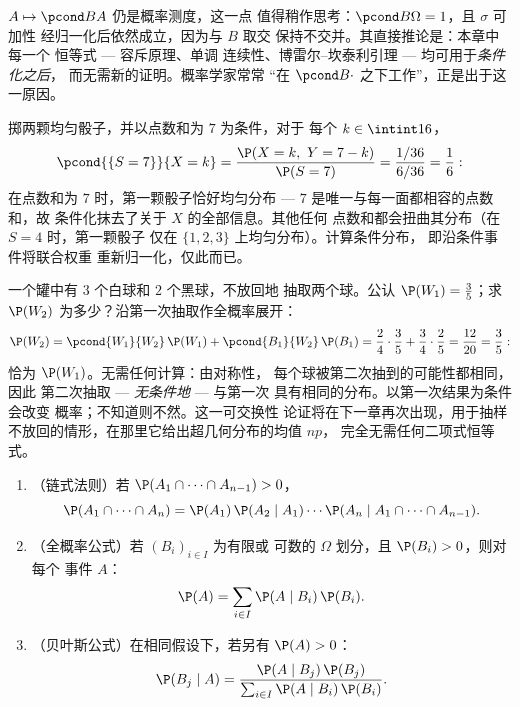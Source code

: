 \begin{remark}
$A \mapsto \pcond BA$ 仍是概率测度，这一点
值得稍作思考：$\pcond B\Omega = 1$，且 $\sigma$ 可加性
经归一化后依然成立，因为与 $B$ 取交
保持不交并。其直接推论是：本章中每一个
恒等式 --- 容斥原理、单调
连续性、博雷尔–坎泰利引理 --- 均可用于\emph{条件化之后}，
而无需新的证明。概率学家常常
“在 $\pcond B{\cdot}$ 之下工作”，正是出于这一原因。
\end{remark}

\begin{example}\label{ex:b2:proba:sumseven}
掷两颗均匀骰子，并以点数和为 $7$ 为条件，对于
每个 $k \in \intint16$，
\[
\pcond{\{S = 7\}}{X = k}
= \frac{\P(X = k,\ Y = 7 - k)}{\P(S = 7)}
= \frac{1/36}{6/36} = \frac16 :
\]
在点数和为 $7$ 时，第一颗骰子恰好均匀分布 ---
$7$ 是唯一与每一面都相容的点数和，故
条件化抹去了关于 $X$ 的全部信息。其他任何
点数和都会扭曲其分布（在 $S = 4$ 时，第一颗骰子
仅在 $\{1, 2, 3\}$ 上均匀分布）。计算条件分布，
即沿条件事件将联合权重
重新归一化，仅此而已。
\end{example}

\begin{example}\label{ex:b2:proba:seconddraw}
一个罐中有 $3$ 个白球和 $2$ 个黑球，不放回地
抽取两个球。公认 $\P(W_1) = \frac35$；求
$\P(W_2)$ 为多少？沿第一次抽取作全概率展开：
\[
\P(W_2) = \pcond{W_1}{W_2}\,\P(W_1) +
\pcond{B_1}{W_2}\,\P(B_1)
= \frac24\cdot\frac35 + \frac34\cdot\frac25
= \frac{12}{20} = \frac35 :
\]
恰为 $\P(W_1)$。无需任何计算：由对称性，
每个球被第二次抽到的可能性都相同，因此
第二次抽取 --- \emph{无条件地} --- 与第一次
具有相同的分布。以第一次结果为条件会改变
概率；不知道则不然。这一可交换性
论证将在下一章再次出现，用于抽样
不放回的情形，在那里它给出超几何分布的均值 $np$，
完全无需任何二项式恒等式。
\end{example}

\begin{theorem}\label{thm:b2:proba:bayes}
\leavevmode
\begin{enumerate}
\item （链式法则）若 $\P(A_1 \cap \dots \cap A_{n-1}) > 0$，
\[
\P(A_1 \cap \dots \cap A_n)
= \P(A_1)\,\P(A_2 \mid A_1)\cdots
\P(A_n \mid A_1 \cap \dots \cap A_{n-1}) .
\]
\item （全概率公式）若 $(B_i)_{i \in I}$ 为有限或
可数的 $\Omega$ 划分，且 $\P(B_i) > 0$，则对每个
事件 $A$：
\[
\P(A) = \sum_{i \in I} \P(A \mid B_i)\,\P(B_i) .
\]
\item （贝叶斯公式）在相同假设下，若另有 $\P(A) > 0$：
\[
\P(B_j \mid A)
= \frac{\P(A \mid B_j)\,\P(B_j)}
       {\sum_{i \in I} \P(A \mid B_i)\,\P(B_i)} .
\]
\end{enumerate}
\end{theorem}


